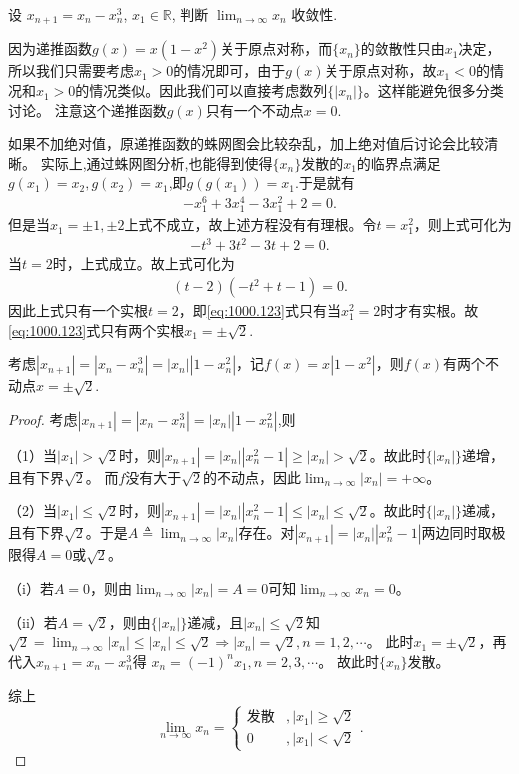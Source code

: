 \documentclass[../../main.tex]{subfiles}
\begin{document}
\begin{example}
设 $x_{n+1} = x_n - x_n^3$, $x_1 \in \mathbb{R}$, 判断 $\lim_{n \to \infty} x_n$ 收敛性.
\end{example}
\begin{note}
因为递推函数$g(x) = x(1 - x^2)$关于原点对称，而$\{ x_n \}$的敛散性只由$x_1$决定，所以我们只需要考虑$x_1 > 0$的情况即可，由于$g(x)$关于原点对称，故$x_1 < 0$的情况和$x_1 > 0$的情况类似。因此我们可以直接考虑数列$\{ |x_n| \}$。这样能避免很多分类讨论。
注意这个递推函数$g(x)$只有一个不动点$x=0$.

如果不加绝对值，原递推函数的蛛网图会比较杂乱，加上绝对值后讨论会比较清晰。
实际上,通过蛛网图分析,也能得到使得$\{x_n\}$发散的$x_1$的临界点满足$g(x_1)=x_2,g(x_2)=x_1$,即$g(g(x_1))=x_1$.于是就有
\begin{align}
-x_1^6 + 3x_1^4 - 3x_1^2 + 2 = 0.\label{eq:1000.123}
\end{align}
但是当$x_1 = \pm 1, \pm 2$上式不成立，故上述方程没有有理根。令$t = x_1^2$，则上式可化为
\begin{align*}
-t^3 + 3t^2 - 3t + 2 = 0.
\end{align*}
当$t = 2$时，上式成立。故上式可化为
\begin{align*}
(t - 2)(-t^2 + t - 1) = 0.
\end{align*}
因此上式只有一个实根$t = 2$，即\eqref{eq:1000.123}式只有当$x_1^2 = 2$时才有实根。故\eqref{eq:1000.123}式只有两个实根$x_1 = \pm \sqrt{2}$.

考虑$|x_{n+1}| = |x_n - x_n^3| = |x_n| |1 - x_n^2|$，记$f(x) = x |1 - x^2|$，则$f(x)$有两个不动点$x=\pm \sqrt{2}.$
\end{note}
\begin{proof}
考虑$|x_{n+1}| = |x_n - x_n^3| = |x_n| |1 - x_n^2|$,则

（1）当$|x_1| > \sqrt{2}$时，则$|x_{n+1}| = |x_n| |x_n^2 - 1| \geqslant |x_n| > \sqrt{2}$。故此时$\{ |x_n| \}$递增，且有下界$\sqrt{2}$。
而$f$没有大于$\sqrt{2}$的不动点，因此$\lim_{n \to \infty} |x_n| = +\infty$。

（2）当$|x_1| \leqslant \sqrt{2}$时，则$|x_{n+1}| = |x_n| |x_n^2 - 1| \leqslant |x_n| \leqslant \sqrt{2}$。故此时$\{ |x_n| \}$递减，且有下界$\sqrt{2}$。于是$A \triangleq \lim_{n \to \infty} |x_n|$存在。对$|x_{n+1}| = |x_n| |x_n^2 - 1|$两边同时取极限得$A = 0$或$\sqrt{2}$。

（i）若$A = 0$，则由$\lim_{n \to \infty} |x_n| = A = 0$可知$\lim_{n \to \infty} x_n = 0$。

（ii）若$A = \sqrt{2}$，则由$\{ |x_n| \}$递减，且$|x_n| \leqslant \sqrt{2}$知
$\sqrt{2} = \lim_{n \to \infty} |x_n| \leqslant |x_n| \leqslant \sqrt{2} \Rightarrow |x_n| = \sqrt{2}, n = 1, 2, \cdots$。
此时$x_1 = \pm \sqrt{2}$，再代入$x_{n+1} = x_n - x_n^3$得
$x_n = (-1)^n x_1, n = 2, 3, \cdots$。
故此时$\{ x_n \}$发散。

综上
$$\lim_{n \to \infty} x_n = \begin{cases} \text{发散}&, |x_1| \geqslant \sqrt{2} \\ 0&,|x_1| < \sqrt{2} \end{cases}.$$

\end{proof}
\end{document}
